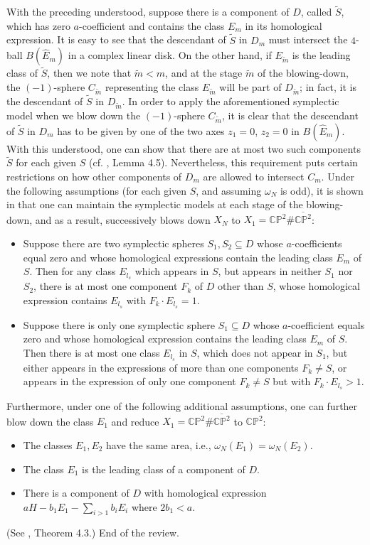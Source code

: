 \documentclass[11pt]{amsart}
\theoremstyle{plain}
\numberwithin{theorem}{section}
\theoremstyle{definition}
\newcommand{\C}{{\mathbb C}}
\renewcommand{\P}{{\mathbb P}}
\begin{document}
With the preceding understood, suppose there is a component of $D$, called $\tilde{S}$, which has zero $a$-coefficient and contains the class $E_m$ in its homological expression. It is easy to see
that the descendant of $\tilde{S}$ in $D_m$ must intersect the $4$-ball $B(\hat{E}_m)$ in a complex linear disk. On the other hand, if $E_{\tilde{m}}$ is the leading class of $\tilde{S}$, then we note that 
$\tilde{m}<m$, and at the stage $\tilde{m}$ of the blowing-down, the $(-1)$-sphere $C_{\tilde{m}}$
representing the class $E_{\tilde{m}}$ will be part of $D_{\tilde{m}}$; in fact, it is the descendant of
$\tilde{S}$ in $D_{\tilde{m}}$. In order to apply the aforementioned symplectic model when we blow down the $(-1)$-sphere $C_{\tilde{m}}$, it is clear that the descendant of $\tilde{S}$ in $D_m$ has to be given by one of the two axes $z_1=0$, $z_2=0$ in $B(\hat{E}_m)$. With this understood, one can show that there are at most two such components $\tilde{S}$ for each given $S$ (cf. \cite{C1}, Lemma 4.5). Nevertheless, this requirement puts certain restrictions on how other components of $D_m$ are allowed to intersect $C_m$. Under the following assumptions (for each given $S$, and assuming
$\omega_N$ is odd), it is shown in \cite{C1} that one can maintain the symplectic models at each stage of the blowing-down, and as a result, successively blows down
$X_N$ to $X_1=\C\P^2\#\overline{\C\P^2}$:
\begin{itemize}
\item [{(a)}] Suppose there are two symplectic spheres $S_1,S_2\subseteq D$ whose $a$-coefficients equal zero and whose homological expressions contain the leading class $E_m$ of $S$. Then for any class $E_{l_s}$ which appears in $S$, but appears in neither $S_1$ nor $S_2$, there is at most one component $F_k$ of $D$ other than $S$, whose homological expression contains $E_{l_s}$ with
$F_k\cdot E_{l_s}=1$.
\item [{(b)}] Suppose there is only one symplectic sphere $S_1\subseteq D$ whose $a$-coefficient 
equals zero and whose homological expression contains the leading class $E_m$ of $S$. 
Then there is at most one class $E_{l_s}$ in $S$, which does not appear in $S_1$, but either appears in the expressions of more than one components $F_k\neq S$, or appears in the expression of only one component $F_k\neq S$ but with $F_k\cdot E_{l_s}>1$.
\end{itemize}
Furthermore, under one of the following additional assumptions, one can further blow down the class $E_1$ and reduce $X_1=\C\P^2\#\overline{\C\P^2}$ to $\C\P^2$:
\begin{itemize}
\item [{(c)}] The classes $E_1,E_2$ have the same area, i.e., $\omega_N(E_1)=\omega_N(E_2)$.
\item [{(d)}] The class $E_1$ is the leading class of a component of $D$. 
\item [{(e)}] There is a component of $D$ with homological expression $aH-b_1E_1-\sum_{i>1}b_i E_i$ where $2b_1<a$.
\end{itemize}
(See \cite{C1}, Theorem 4.3.) End of the review. 
\end{document}

